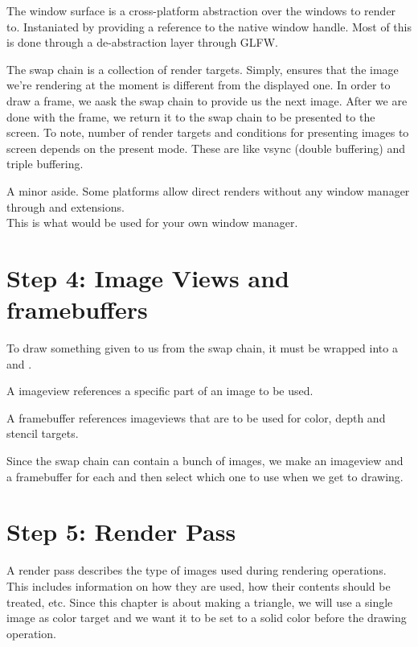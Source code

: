 \par The window surface is a cross-platform abstraction over the windows to render to. Instaniated by providing a reference to the native window handle. Most of this is done through a de-abstraction layer through GLFW.

\par The swap chain is a collection of render targets. Simply, ensures that the image we're rendering at the moment is different from the displayed one. In order to draw a frame, we aask the swap chain to provide us the next image. After we are done with the frame, we return it to the swap chain to be presented to the screen. To note, number of render targets and conditions for presenting images to screen depends on the present mode. These are like vsync (double buffering) and triple buffering.

\par A minor aside. Some platforms allow direct renders without any window manager through 
and  extensions. \\ 
This is what would be used for your own window manager. 

\section*{Step 4: Image Views and framebuffers}
\par To draw something given to us from the swap chain, it must be wrapped into a  and . 
\par A imageview references a specific part of an image to be used.

\par A framebuffer references imageviews that are to be used for color, depth and stencil targets.

\par Since the swap chain can contain a bunch of images, we make an imageview and a framebuffer for each and then select which one to use when we get to drawing.

\section*{Step 5: Render Pass}
\par A render pass describes the type of images used during rendering operations. This includes information on how they are used, how their contents should be treated, etc. Since this chapter is about making a triangle, we will use a single image as color target and we want it to be set to a solid color before the drawing operation.

